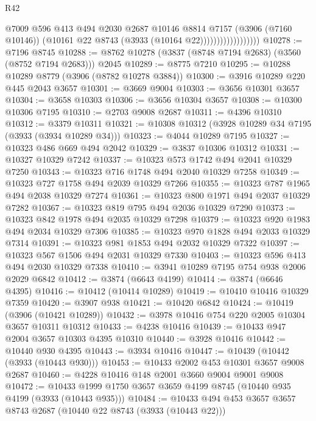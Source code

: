 \begin{lexlean}{R42}
\begin{coremodule}
                                  @7009
                                  @596
                                  @413
                                  @494
                                  @2030
                                  @2687
                                  @10146
                                  @8814
                                  @7157
                                  (@3906 (@7160 @10146))
                                  (@10161 @22 @8743 (@3933 (@10164 @22))))))))))))))))))
@10278 := @7196 @8745
@10288 := @8762 @10278 (@3837 (@8748 @7194 @2683) (@3560 (@8752 @7194 @2683))) @2045
@10289 := @8775 @7210
@10295 := @10288 @10289 @8779 (@3906 (@8782 @10278 @3884))
@10300 := @3916 @10289 @220 @445 @2043 @3657
@10301 := @3669 @9004
@10303 := @3656 @10301 @3657
@10304 := @3658 @10303
@10306 := @3656 @10304 @3657
@10308 := @10300 @10306 @7195
@10310 := @2703 @9008 @2687
@10311 := @4396 @10310
@10312 := @3379 @10311
@10321 := @10308 @10312 (@3928 @10289 @34 @7195 (@3933 (@3934 @10289 @34)))
@10323 := @4044 @10289 @7195
@10327 := @10323 @486 @669 @494 @2042
@10329 := @3837 @10306 @10312
@10331 := @10327 @10329 @7242
@10337 := @10323 @573 @1742 @494 @2041 @10329 @7250
@10343 := @10323 @716 @1748 @494 @2040 @10329 @7258
@10349 := @10323 @727 @1758 @494 @2039 @10329 @7266
@10355 := @10323 @787 @1965 @494 @2038 @10329 @7274
@10361 := @10323 @800 @1971 @494 @2037 @10329 @7282
@10367 := @10323 @819 @795 @494 @2036 @10329 @7290
@10373 := @10323 @842 @1978 @494 @2035 @10329 @7298
@10379 := @10323 @920 @1983 @494 @2034 @10329 @7306
@10385 := @10323 @970 @1828 @494 @2033 @10329 @7314
@10391 := @10323 @981 @1853 @494 @2032 @10329 @7322
@10397 := @10323 @567 @1506 @494 @2031 @10329 @7330
@10403 := @10323 @596 @413 @494 @2030 @10329 @7338
@10410 := @3941 @10289 @7195 @754 @938 @2006 @2029 @6842
@10412 := @3874 (@6643 @4199)
@10414 := @3874 (@6646 @4395)
@10416 := @10412 (@10414 @10289)
@10419 := @10410 @10416 @10329 @7359
@10420 := @3907 @938
@10421 := @10420 @6842
@10424 := @10419 (@3906 (@10421 @10289))
@10432 := @3978 @10416 @754 @220 @2005 @10304 @3657 @10311 @10312
@10433 := @4238 @10416
@10439 := @10433 @947 @2004 @3657 @10303 @4395 @10310
@10440 := @3928 @10416
@10442 := @10440 @930 @4395
@10443 := @3934 @10416
@10447 := @10439 (@10442 (@3933 (@10443 @930)))
@10453 := @10433 @2002 @453 @10301 @3657 @9008 @2687
@10460 := @4228 @10416 @148 @2001 @3660 @9004 @9001 @9008
@10472 := @10433 @1999 @1750 @3657 @3659 @4199 @8745 (@10440 @935 @4199 (@3933 (@10443 @935)))
@10484 := @10433 @494 @453 @3657 @3657 @8743 @2687 (@10440 @22 @8743 (@3933 (@10443 @22)))

\end{coremodule}
\end{lexlean}
